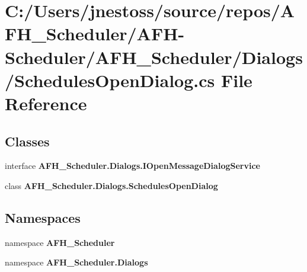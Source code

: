 \section{C\+:/\+Users/jnestoss/source/repos/\+A\+F\+H\+\_\+\+Scheduler/\+A\+F\+H-\/\+Scheduler/\+A\+F\+H\+\_\+\+Scheduler/\+Dialogs/\+Schedules\+Open\+Dialog.cs File Reference}
\label{_schedules_open_dialog_8cs}
\subsection*{Classes}
\begin{DoxyCompactItemize}
\item 
interface \textbf{ A\+F\+H\+\_\+\+Scheduler.\+Dialogs.\+I\+Open\+Message\+Dialog\+Service}
\item 
class \textbf{ A\+F\+H\+\_\+\+Scheduler.\+Dialogs.\+Schedules\+Open\+Dialog}
\end{DoxyCompactItemize}
\subsection*{Namespaces}
\begin{DoxyCompactItemize}
\item 
namespace \textbf{ A\+F\+H\+\_\+\+Scheduler}
\item 
namespace \textbf{ A\+F\+H\+\_\+\+Scheduler.\+Dialogs}
\end{DoxyCompactItemize}
